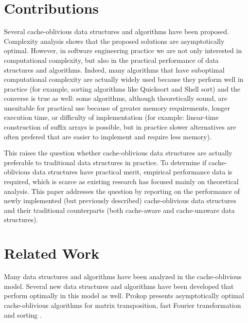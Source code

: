 \documentclass{acm_proc_article-sp}
\begin{document}


\section{Contributions}
Several cache-oblivious data structures and algorithms have been proposed. Complexity analysis shows that the proposed solutions are asymptotically optimal. However, in software engineering practice we are not only interested in computational complexity, but also in the practical performance of data structures and algorithms. Indeed, many algorithms that have suboptimal computational complexity are actually widely used because they perform well in practice (for example, sorting algorithms like Quicksort and Shell sort) and the converse is true as well: some algorithms, although theoretically sound, are unsuitable for practical use because of greater memory requirements, longer execution time, or difficulty of implementation (for example: linear-time construction of suffix arrays is possible, but in practice slower alternatives are often prefered that are easier to implement and require less memory).

This raises the question whether cache-oblivious data structures are actually preferable to traditional data structures in practice. To determine if cache-oblivious data structures have practical merit, empirical performance data is required, which is scarce as existing research has focused mainly on theoretical analysis. This paper addresses the question by reporting on the performance of newly implemented (but previously described) cache-oblivious data structures and their traditional counterparts (both cache-aware and cache-unaware data structures).

\section{Related Work}
Many data structures and algorithms have been analyzed in the cache-oblivious model. Several new data structures and algorithms have been developed that perform optimally in this mo\-del as well. Prokop presents asymptotically optimal cache-oblivious algorithms for matrix transposition, fast Fourier transformation and sorting \cite{prokop1999coa}.
\end{document}
